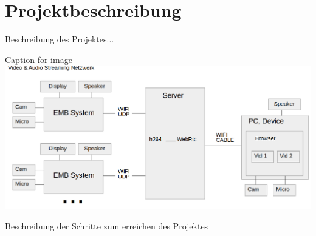 \newpage
\section{Projektbeschreibung}

Beschreibung des Projektes...\\


\begin{minipage}{\textwidth}
    \begin{center}
        Caption for image
        \includegraphics[scale=0.4]{img/schemaproj.png} 
    \end{center}
\end{minipage}


Beschreibung der Schritte zum erreichen des Projektes



